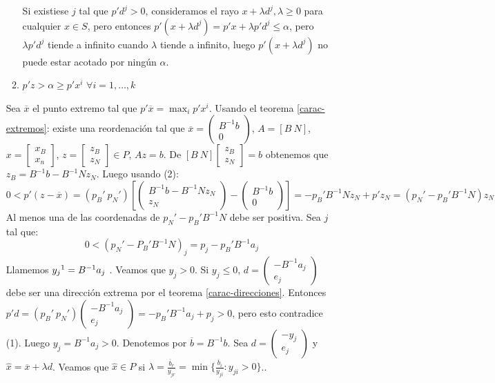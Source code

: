 \documentclass[PM.tex]{subfiles}
\begin{document}
\begin{dem}
\begin{itemize}
\begin{enumerate}
		Si existiese $j$ tal que $p'd^j > 0$, consideramos el rayo $x + λd^j, λ ≥ 0$ para cualquier $x \in S$, pero entonces $p'(x+λd^j) = p'x + λp'd^j ≤ α$, pero $λp'd^j$ tiende a infinito cuando $λ$ tiende a infinito, luego $p'(x+λd^j)$ no puede estar acotado por ningún $α$.
		\item $p'z > α ≥ p'x^i$ $\forall i=1,\dots,k$
	\end{enumerate}
	Sea $\overline{x}$ el punto extremo tal que $p'\overline{x} = \max_i p'x^i$. Usando el teorema \ref{carac-extremos}: existe una reordenación tal que $\overline{x} = \begin{pmatrix}B^{-1}b\\0\end{pmatrix}$, $A = [B\ N]$, $x = \begin{bmatrix}x_B\\x_n\end{bmatrix}$, $z = \begin{bmatrix}z_B\\z_N\end{bmatrix} \in P$, $Az=b$. De $[B\ N]\begin{bmatrix}z_B\\z_N\end{bmatrix} = b$ obtenemos que $z_B = B^{-1}b-B^{-1}Nz_N$. Luego usando (2):
	\[ 0 < p'(z-\overline{x}) = (p_B'\ p_N') \left[\begin{pmatrix}B^{-1}b-B^{-1}Nz_N\\z_N\end{pmatrix}-\begin{pmatrix}B^{-1}b\\0\end{pmatrix}\right] =-p_B'B^{-1}Nz_N + p'z_N = (p_N'-p_B'B^{-1}N)z_N \]
	Al menos una de las coordenadas de $p_N'-p_B'B^{-1}N$ debe ser positiva. Sea $j$ tal que:
	\[ 0 < (p_N'-P_B'B^{-1}N)_j = p_j - p_B'B^{-1}a_j \]
	Llamemos $y_j\footnote{\url{https://www.youtube.com/watch?v=q6EoRBvdVPQ}} = B^{-1}a_j$ . Veamos que $y_j > 0$. Si $y_j ≤ 0$, $d = \begin{pmatrix}-B^{-1}a_j\\e_j\end{pmatrix}$ debe ser una dirección extrema por el teorema \ref{carac-direcciones}. Entonces $p'd = (p_B'\ p_N')\begin{pmatrix}-B^{-1}a_j\\e_j\end{pmatrix}=-p_B'B^{-1}a_j + p_j > 0$, pero esto contradice (1). Luego $y_j = B^{-1}a_j > 0$. Denotemos por $\overline{b}=B^{-1}b$. Sea $d = \begin{pmatrix}-y_j\\e_j\end{pmatrix}$ y $\hat{x} = \overline{x} + λd$. Veamos que $\hat{x} \in P$ si $λ = \frac{\overline{b}_r}{y_{jr}} = \min\{\frac{\overline{b}_i}{y_{ji}} : y_{ji} > 0\}$..

\end{itemize}
\end{dem}
\end{document}
